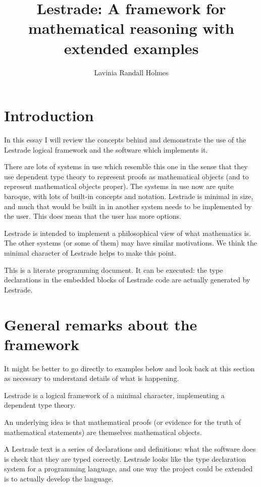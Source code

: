 \documentclass[12pt]{article}
\title{Lestrade:  A framework for mathematical reasoning with extended examples}
\author{Lavinia Randall Holmes}
\begin{document}
\maketitle

\section{Introduction}

In this essay I will review the concepts behind and demonstrate the use of the Lestrade logical framework and the software which implements it.

There are lots of systems in use which resemble this one in the sense that they use dependent type theory to represent proofs as mathematical objects (and to represent mathematical objects proper).  The systems in use now are quite baroque, with lots of built-in concepts and notation.  Lestrade is minimal in size, and much that would be built in in another system needs to be implemented by the user.  This does mean that the user has more options.

Lestrade is intended to implement a philosophical view of what mathematics is.  The other systems (or some of them) may have similar motivations.  We think the minimal character of Lestrade helps to make this point.

This is a literate programming document.  It can be executed:  the type declarations in the embedded blocks of Lestrade code are actually generated by Lestrade.

\section{General remarks about the framework}

It might be better to go directly to examples below and look back at this section as necessary to understand details of what is happening.


Lestrade is a logical framework of a minimal character, implementing a dependent type theory.

An underlying idea is that mathematical proofs (or evidence for the truth of mathematical statements) are themselves mathematical objects.

A Lestrade text is a series of declarations and definitions:  what the software does is check that they are typed correctly.  Lestrade looks like the type declaration system for a programming language,
and one way the project could be extended is to actually develop the language.
\end{document}
